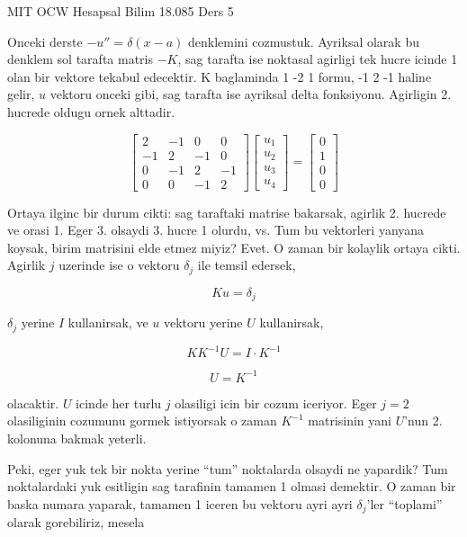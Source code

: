 \documentclass[12pt,fleqn]{article}
\begin{document}
MIT OCW Hesapsal Bilim 18.085 Ders 5

Onceki derste $-u'' = \delta(x-a)$ denklemini cozmustuk. Ayriksal olarak bu
denklem sol tarafta matris $-K$, sag tarafta ise noktasal agirligi tek
hucre icinde 1 olan bir vektore tekabul edecektir. K baglaminda 1 -2 1
formu, -1 2 -1 haline gelir, $u$ vektoru onceki gibi, sag tarafta ise
ayriksal delta fonksiyonu. Agirligin 2. hucrede oldugu ornek alttadir. 

\[  
\left[\begin{array}{cccc}
2 & -1 & 0 & 0 \\
-1 & 2 & -1 & 0 \\
0 & -1 & 2 & -1 \\
0 & 0 & -1 & 2 
\end{array}\right]
\left[\begin{array}{c}
u_1 \\
u_2 \\
u_3 \\
u_4
\end{array}\right]
=
\left[\begin{array}{c}
0 \\
1 \\
0 \\
0
\end{array}\right]
\]

Ortaya ilginc bir durum cikti: sag taraftaki matrise bakarsak, agirlik
2. hucrede ve orasi 1. Eger 3. olsaydi 3. hucre 1 olurdu, vs. Tum bu
vektorleri yanyana koysak, birim matrisini elde etmez miyiz? Evet. O zaman
bir kolaylik ortaya cikti. Agirlik $j$ uzerinde ise o vektoru $\delta_j$
ile temsil edersek, 

\[ Ku = \delta_j \]

$\delta_j$ yerine $I$ kullanirsak, ve $u$ vektoru yerine $U$ kullanirsak,

\[ KK^{-1}U = I \cdot K^{-1}\]

\[ U = K^{-1} \]

olacaktir. $U$ icinde her turlu $j$ olasiligi icin bir cozum iceriyor. Eger
$j=2$ olasiliginin cozumunu gormek istiyorsak o zaman $K^{-1}$ matrisinin
yani $U$'nun 2. kolonuna bakmak yeterli.

Peki, eger yuk tek bir nokta yerine ``tum'' noktalarda olsaydi ne yapardik?
Tum noktalardaki yuk esitligin sag tarafinin tamamen 1 olmasi demektir. O
zaman bir baska numara yaparak, tamamen 1 iceren bu vektoru ayri ayri
$\delta_j$'ler ``toplami'' olarak gorebiliriz, mesela
\end{document}
